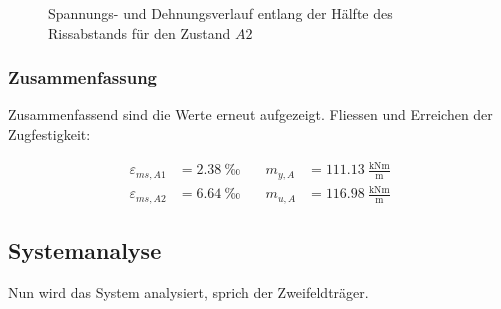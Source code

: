 \documentclass[
  11pt,
  letterpaper,
]{scrreprt}
\begin{document}
\begin{figure}[H]

\begin{minipage}{0.50\linewidth}



\end{minipage}%
%
\begin{minipage}{0.50\linewidth}



\end{minipage}%

\caption{\label{fig-jag_zustand_a2}Spannungs- und Dehnungsverlauf
entlang der Hälfte des Rissabstands für den Zustand \(A2\)}

\end{figure}%

\subsubsection{Zusammenfassung}\label{zusammenfassung}

Zusammenfassend sind die Werte erneut aufgezeigt. Fliessen und Erreichen
der Zugfestigkeit:

\[
\begin{aligned}
\varepsilon_{m s , A1}& = 2.38 \ \mathrm{‰} \quad & m_{y , A}& = 111.13 \ \frac{\mathrm{kNm}}{\mathrm{m}} \\ 
\varepsilon_{m s , A2}& = 6.64 \ \mathrm{‰} \quad & m_{u , A}& = 116.98 \ \frac{\mathrm{kNm}}{\mathrm{m}} \end{aligned}
\]

\subsection{Systemanalyse}\label{systemanalyse}

Nun wird das System analysiert, sprich der Zweifeldträger.
\end{document}
